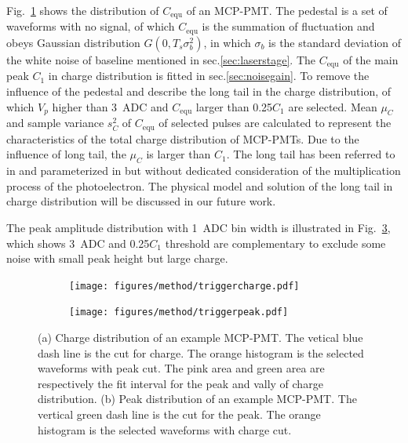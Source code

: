 Fig.~\ref{fig:triggercharge} shows the distribution of $C_{\mathrm{equ}}$ of an MCP-PMT. The pedestal is a set of waveforms with no signal, of which $C_{\mathrm{equ}}$ is the summation of fluctuation and obeys Gaussian distribution $G(0, T_s\sigma_b^2)$, in which $\sigma_b$ is the standard deviation of the white noise of baseline mentioned in sec.\ref{sec:laserstage}. The $C_{\mathrm{equ}}$ of the main peak $C_1$ in charge distribution is fitted in sec.\ref{sec:noisegain}. To remove the influence of the pedestal and describe the long tail in the charge distribution, of which $V_p$ higher than \SI{3}{ADC} and $C_{\mathrm{equ}}$ larger than 0.25$C_1$ are selected. Mean $\mu_{C}$ and sample variance $s^2_{C}$ of $C_{\mathrm{equ}}$ of selected pulses are calculated to represent the characteristics of the total charge distribution of MCP-PMTs. Due to the influence of long tail, the $\mu_{C}$ is larger than $C_1$. The long tail has been referred to in \cite{JUNOMassTesting} and parameterized in \cite{JUNOLongtail} but without dedicated consideration of the multiplication process of the photoelectron. The physical model and solution of the long tail in charge distribution will be discussed in our future work.

The peak amplitude distribution with \SI{1}{ADC} bin width is illustrated in Fig.~\ref{fig:triggerpeak}, which shows \SI{3}{ADC} and 0.25$C_1$ threshold are complementary to exclude some noise with small peak height but large charge.

\begin{figure}[!htbp]
    \centering
    \begin{subfigure}[b]{\SF\textwidth}
        \texttt{[image: figures/method/triggercharge.pdf]}
        \caption{}%
        \label{fig:triggercharge}
    \end{subfigure}
    \begin{subfigure}[b]{\SF\textwidth}
        \texttt{[image: figures/method/triggerpeak.pdf]}
        \caption{}%
        \label{fig:triggerpeak}
    \end{subfigure}
    \caption{(a) Charge distribution of an example MCP-PMT. The vetical blue dash line is the cut for charge. The orange histogram is the selected waveforms with peak cut. The pink area and green area are respectively the fit interval for the peak and vally of charge distribution. (b) Peak distribution of an example MCP-PMT. The vertical green dash line is the cut for the peak. The orange histogram is the selected waveforms with charge cut.}
\end{figure}

